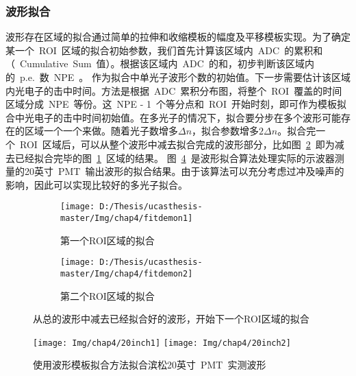 \subsubsection{波形拟合}
波形存在区域的拟合通过简单的拉伸和收缩模板的幅度及平移模板实现。为了确定某一个~ROI~区域的拟合初始参数，我们首先计算该区域内~ADC~的累积和（~Cumulative~Sum~值）。根据该区域内~ADC~的和，初步判断该区域内的~p.e.~数~NPE~。 作为拟合中单光子波形个数的初始值。下一步需要估计该区域内光电子的击中时间。方法是根据~ADC~累积分布图，将整个~ROI~覆盖的时间区域分成~NPE~等份。这~NPE - 1~个等分点和~ROI~开始时刻，即可作为模板拟合中光电子的击中时间初始值。在多光子的情况下，拟合要分步在多个波形可能存在的区域一个一个来做。随着光子数增多$\Delta n$，拟合参数增多$2 \Delta n$。拟合完一个~ROI~区域后，可以从整个波形中减去拟合完成的波形部分，比如图~\ref{fig:fitdemo_2}~即为减去已经拟合完毕的图~\ref{fig:fitdemo_1}~区域的结果。
图~\ref{fig:20inch}~是波形拟合算法处理实际的示波器测量的20英寸~PMT~输出波形的拟合结果。由于该算法可以充分考虑过冲及噪声的影响，因此可以实现比较好的多光子拟合。
\begin{figure}[!htbp]
  \centering
  \begin{subfigure}[b]{\MySubFactor\textwidth}
    \texttt{[image: D:/Thesis/ucasthesis-master/Img/chap4/fitdemon1]}
    \caption{第一个ROI区域的拟合}
    \label{fig:fitdemo_1}
  \end{subfigure}%
   \vspace{10 mm}
  \begin{subfigure}[b]{\MySubFactor\textwidth}
    \texttt{[image: D:/Thesis/ucasthesis-master/Img/chap4/fitdemon2]}
    \caption{第二个ROI区域的拟合}
    \label{fig:fitdemo_2}
  \end{subfigure}
    \caption{从总的波形中减去已经拟合好的波形，开始下一个ROI区域的拟合}
  \label{fig:模板拟合示意图}
\end{figure}

\begin{figure}[!htbp]
  \centering
   \texttt{[image: Img/chap4/20inch1]}
   \vspace{10 mm}
   \texttt{[image: Img/chap4/20inch2]}
    \caption{使用波形模板拟合方法拟合滨松20英寸~PMT~实测波形}
  \label{fig:20inch}
\end{figure}


